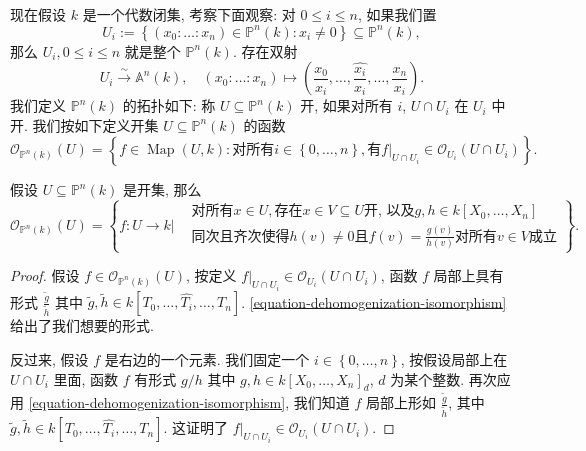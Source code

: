 现在假设 \( k \) 是一个代数闭集, 考察下面观察: 对 \( 0 \leq i \leq n \),
如果我们置
\[
  U_i := \left\lbrace (x_0: \ldots :x_n) \in \mathbb{P}^n(k): x_i \neq 0
  \right\rbrace \subseteq \mathbb{P}^n(k),
\]
那么 \( U_i, 0 \leq i \leq n \) 就是整个 \( \mathbb{P}^n(k) \). 存在双射
\[
  U_i \xrightarrow{\sim} \mathbb{A}^n(k),\quad (x_0: \ldots: x_n) \mapsto \left(
  \frac{x_0}{x_i}, \ldots, \widehat{\frac{x_i}{x_i}}, \ldots, \frac{x_n}{x_i}
\right).
\]
我们定义 \( \mathbb{P}^n(k) \) 的拓扑如下: 称 \( U \subseteq \mathbb{P}^n(k) \)
开, 如果对所有 \( i \), \( U \cap U_i \) 在 \( U_i \) 中开.
我们按如下定义开集 \( U \subseteq \mathbb{P}^n(k) \) 的函数
\[
  \mathscr{O}_{\mathbb{P}^n(k)}(U) = \left\lbrace f \in \operatorname{Map}(U,
  k): \text{对所有} i \in \left\lbrace 0, \ldots, n \right\rbrace, \text{有}
  \left. f \right\vert_{U \cap U_i} \in \mathcal{O}_{U_i}(U \cap U_i)
  \right\rbrace.
\]
\begin{proposition}
  假设 \( U \subseteq \mathbb{P}^n(k) \) 是开集, 那么
  \[
    \mathscr{O}_{\mathbb{P}^n(k)}(U) = \left\lbrace f: U \to k \Bigg\vert
      \begin{aligned}
      &\text{对所有} x \in U, \text{存在} x \in V \subseteq U \text{开, 以及} g,
      h \in k[X_0,\ldots, X_n]\\& \text{同次且齐次使得} h(v) \neq 0 \text{且}
      f(v) = \frac{g(v)}{h(v)} \text{对所有} v \in V \text{成立}
    \end{aligned} \right\rbrace.
  \]
\end{proposition}
\begin{proof}
  假设 \( f \in \mathscr{O}_{\mathbb{P}^n(k)}(U) \), 按定义 \( \left. f
    \right\vert_{U \cap U_i} \in \mathscr{O}_{U_i}(U \cap U_i) \), 函数 \( f \)
    局部上具有形式 \( \frac{\widetilde{g}}{\widetilde{h}} \) 其中 \(
    \widetilde{g}, \widetilde{h} \in k[T_0, \ldots, \widehat{T_i}, \ldots, T_n]
    \). \eqref{equation-dehomogenization-isomorphism} 给出了我们想要的形式.

  反过来, 假设 \( f \) 是右边的一个元素. 我们固定一个 \( i \in \left\lbrace 0,
  \ldots, n \right\rbrace \), 按假设局部上在 \( U \cap U_i \) 里面, 函数 \( f \)
  有形式 \( g/h \) 其中 \( g, h \in k[X_0,\ldots, X_n]_d \), \( d \) 为某个整数.
  再次应用 \eqref{equation-dehomogenization-isomorphism}, 我们知道 \( f \)
  局部上形如 \( \frac{\widetilde{g}}{\widetilde{h}} \), 其中 \( \widetilde{g},
  \widetilde{h} \in k[T_0, \ldots, \widehat{T_i}, \ldots, T_n] \). 这证明了 \(
  \left. f \right\vert_{U \cap U_i} \in \mathscr{O}_{U_i}(U \cap U_i) \).
\end{proof}

